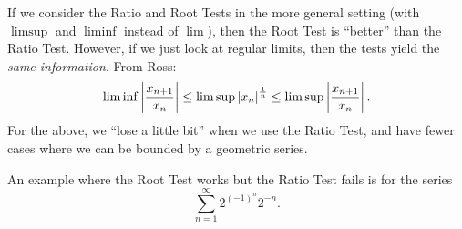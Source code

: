 \documentclass[class=article, crop=false]{standalone}
\begin{document}
  \begin{note}{}
    If we consider the Ratio and Root Tests in the more general setting (with $\limsup$ and $\liminf$ instead of $\lim$), then the Root Test is ``better'' than the Ratio Test. However, if we just look at regular limits, then the tests yield the \emph{same information}. From Ross:
    \[
      \liminf \left\lvert \frac{x_{n + 1}}{x_n} \right\rvert\leq \limsup \left\lvert x_n \right\rvert^{\frac{1}{n}}\leq \limsup \left\lvert \frac{x_{n + 1}}{x_n} \right\rvert.
    \]
    For the above, we ``lose a little bit'' when we use the Ratio Test, and have fewer cases where we can be bounded by a geometric series.
  \end{note}
  \begin{example}{}
    An example where the Root Test works but the Ratio Test fails is for the series
    \[
      \sum_{n=1}^{\infty}2^{(-1)^n}2^{-n}.
    \]
  \end{example}
\end{document}
